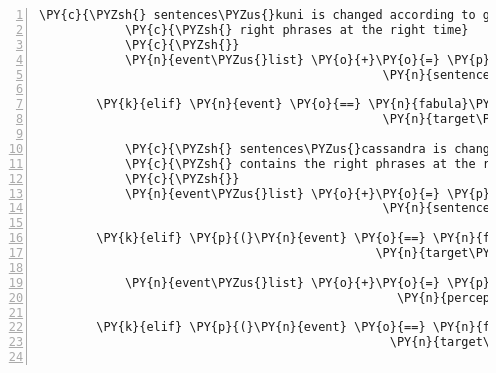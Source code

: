 \begin{Verbatim}[commandchars=\\\{\},numbers=left,firstnumber=1,stepnumber=1]
            \PY{c}{\PYZsh{} sentences\PYZus{}kuni is changed according to game logic and contains the}
            \PY{c}{\PYZsh{} right phrases at the right time}
            \PY{c}{\PYZsh{}}
            \PY{n}{event\PYZus{}list} \PY{o}{+}\PY{o}{=} \PY{p}{[}\PY{n}{fabula}\PY{o}{.}\PY{n}{CanSpeakEvent}\PY{p}{(}\PY{n}{identifier}\PY{o}{=}\PY{n}{ID\PYZus{}KUNI}\PY{p}{,}
                                                \PY{n}{sentences}\PY{o}{=}\PY{n+nb+bp}{self}\PY{o}{.}\PY{n}{sentences\PYZus{}kuni}\PY{p}{)}\PY{p}{]}

        \PY{k}{elif} \PY{n}{event} \PY{o}{==} \PY{n}{fabula}\PY{o}{.}\PY{n}{TriesToTalkToEvent}\PY{p}{(}\PY{n}{identifier}\PY{o}{=}\PY{n}{ID\PYZus{}CASSANDRA}\PY{p}{,}
                                                \PY{n}{target\PYZus{}identifier}\PY{o}{=}\PY{n}{ID\PYZus{}KUNI}\PY{p}{)}\PY{p}{:}

            \PY{c}{\PYZsh{} sentences\PYZus{}cassandra is changed according to game logic and}
            \PY{c}{\PYZsh{} contains the right phrases at the right time}
            \PY{c}{\PYZsh{}}
            \PY{n}{event\PYZus{}list} \PY{o}{+}\PY{o}{=} \PY{p}{[}\PY{n}{fabula}\PY{o}{.}\PY{n}{CanSpeakEvent}\PY{p}{(}\PY{n}{identifier}\PY{o}{=}\PY{n}{ID\PYZus{}CASSANDRA}\PY{p}{,}
                                                \PY{n}{sentences}\PY{o}{=}\PY{n+nb+bp}{self}\PY{o}{.}\PY{n}{sentences\PYZus{}cassandra}\PY{p}{)}\PY{p}{]}

        \PY{k}{elif} \PY{p}{(}\PY{n}{event} \PY{o}{==} \PY{n}{fabula}\PY{o}{.}\PY{n}{TriesToLookAtEvent}\PY{p}{(}\PY{n}{identifier}\PY{o}{=}\PY{n}{ID\PYZus{}CASSANDRA}\PY{p}{,}
                                               \PY{n}{target\PYZus{}identifier}\PY{o}{=}\PY{l+s}{\PYZsq{}}\PY{l+s}{pry}\PY{l+s}{\PYZsq{}}\PY{p}{)}\PY{p}{)}\PY{p}{:}

            \PY{n}{event\PYZus{}list} \PY{o}{+}\PY{o}{=} \PY{p}{[}\PY{n}{fabula}\PY{o}{.}\PY{n}{PerceptionEvent}\PY{p}{(}\PY{n}{identifier}\PY{o}{=}\PY{n}{ID\PYZus{}CASSANDRA}\PY{p}{,}
                                                  \PY{n}{perception}\PY{o}{=}\PY{l+s}{\PYZsq{}}\PY{l+s}{Ein Brecheisen, das könnte noch nützlich sein.}\PY{l+s}{\PYZsq{}}\PY{p}{)}\PY{p}{]}

        \PY{k}{elif} \PY{p}{(}\PY{n}{event} \PY{o}{==} \PY{n}{fabula}\PY{o}{.}\PY{n}{TriesToLookAtEvent}\PY{p}{(}\PY{n}{identifier}\PY{o}{=}\PY{n}{ID\PYZus{}CASSANDRA}\PY{p}{,}
                                                 \PY{n}{target\PYZus{}identifier}\PY{o}{=}\PY{l+s}{\PYZsq{}}\PY{l+s}{cake}\PY{l+s}{\PYZsq{}}\PY{p}{)}\PY{p}{)}\PY{p}{:}


\end{Verbatim}
